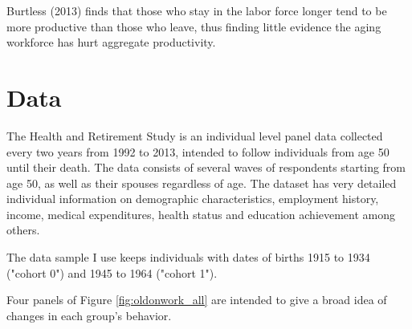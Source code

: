 \documentclass[
10pt, %
a4paper, %
oneside, %
headinclude,footinclude, %
BCOR5mm, %
]{scrartcl}
\begin{document}
Burtless (2013\cite{Burtless2013}) finds that those who stay in the labor force longer tend to be more productive than those who leave, thus finding little evidence the aging workforce has hurt aggregate productivity.

\section{Data}
The Health and Retirement Study is an individual level panel data collected every two years from 1992 to 2013, intended to follow individuals from age 50 until their death. The data consists of several waves of respondents starting from age 50, as well as their spouses regardless of age. The dataset has very detailed individual information on demographic characteristics, employment history, income, medical expenditures, health status and education achievement among others.

The data sample I use keeps individuals with dates of births 1915 to 1934 ("cohort 0") and 1945 to 1964 ("cohort 1"). 

Four panels of Figure \vref{fig:oldonwork_all} are intended to give a broad idea of changes in each group's behavior.
\end{document}
